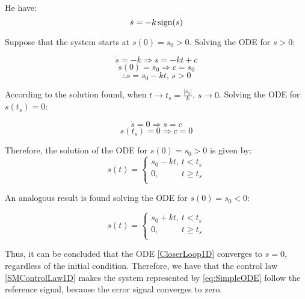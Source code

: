 He have:
\begin{equation} \label{CloserLoop1D}
\dot{s} = -k \operatorname*{sign}(s) 
\end{equation}

Suppose that the system starts at $s(0) = s_0 >0$. Solving the ODE for $s>0$:

$$ \dot{s} = -k \Rightarrow s = -k t + c $$
$$ s(0) = s_0 \Rightarrow c = s_0 $$
$$ \therefore s = s_0 - k t, \, s>0 $$

According to the solution found, when $t \rightarrow t_s = \frac{|s_0|}{k}$, $s \rightarrow 0 $. Solving the ODE for $s(t_s) = 0$:

$$ \dot{s} = 0 \Rightarrow s =  c $$
$$ s(t_s) = 0 \Rightarrow c = 0 $$

Therefore, the solution of the ODE for $s(0) = s_0 > 0$ is given by:
\begin{equation} \label{eq:SM-ODE-Sol1}
s(t) =
\begin{cases}
s_0 - k t, \, t < t_s \\
0, \,\,\,\,\,\,\,\,\,\,\,\,\,\,\,\, t \geq t_s \\
\end{cases}
\end{equation}

An analogous result is found solving the ODE for $s(0) = s_0 < 0$:

\begin{equation} \label{eq:SM-ODE-Sol2}
s(t) =
\begin{cases}
s_0 + k t, \, t < t_s \\
0, \,\,\,\,\,\,\,\,\,\,\,\,\,\,\,\, t \geq t_s \\
\end{cases}
\end{equation}

Thus, it can be concluded that the ODE \eqref{CloserLoop1D} converges to $s=0$, regardless of the initial condition.
Therefore, we have that the control law \eqref{SMControlLaw1D} makes the system represented by \eqref{eq:SimpleODE} follow the reference signal, because the error signal converges to zero.

